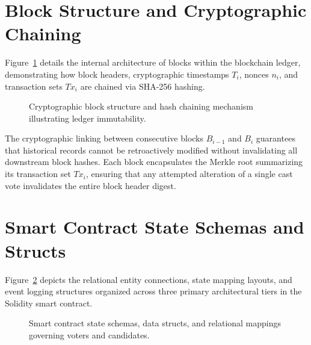 \documentclass[12pt,a4paper]{report}
\begin{document}
\section{Block Structure and Cryptographic Chaining}
Figure~\ref{fig:block_structure} details the internal architecture of blocks within the blockchain ledger, demonstrating how block headers, cryptographic timestamps $T_i$, nonces $n_i$, and transaction sets $Tx_i$ are chained via SHA-256 hashing.

\begin{figure}[H]
\centering
{}
\caption{Cryptographic block structure and hash chaining mechanism illustrating ledger immutability.}
\label{fig:block_structure}
\end{figure}

The cryptographic linking between consecutive blocks $B_{i-1}$ and $B_i$ guarantees that historical records cannot be retroactively modified without invalidating all downstream block hashes. Each block encapsulates the Merkle root summarizing its transaction set $Tx_i$, ensuring that any attempted alteration of a single cast vote invalidates the entire block header digest.

\section{Smart Contract State Schemas and Structs}
Figure~\ref{fig:db_schema} depicts the relational entity connections, state mapping layouts, and event logging structures organized across three primary architectural tiers in the Solidity smart contract.

\begin{figure}[H]
\centering
\vspace{-0.5em}
\vspace{-0.5em}
\caption{Smart contract state schemas, data structs, and relational mappings governing voters and candidates.}
\label{fig:db_schema}
\end{figure}
\vspace{-0.6em}
\end{document}
